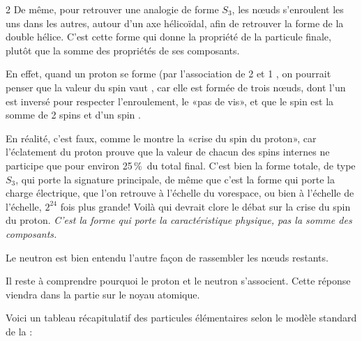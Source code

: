 \begin{multicols}{2}
De même, pour retrouver une analogie de forme $S_3$, les nœuds
s'enroulent les uns dans les autres, autour d'un axe hélicoïdal, afin
de retrouver la forme de la double hélice. C'est cette forme qui donne
la propriété de la particule finale, plutôt que la somme des
propriétés de ses composants.

En effet, quand un proton se forme (par l'association de 2 
et 1 , on pourrait penser que la valeur du spin vaut ,
car elle est formée de trois nœuds, dont l'un est inversé pour
respecter l'enroulement, le «pas de vis», et que le spin est la somme
de 2 spins  et d'un spin . 

En réalité, c'est faux, comme le
montre la «crise du spin du proton», car l'éclatement du proton
prouve que la valeur de chacun des spins internes ne participe
que pour environ 25\,\%\ du total final\cite{ashman1988measurement}. C'est bien la forme totale, de
type $S_3$, qui porte la signature principale, de même que c'est la
forme  qui porte la charge électrique, que l'on retrouve à
l'échelle du vorespace, ou bien à l'échelle de l'échelle, $2^{24}$ fois
plus grande! Voilà qui devrait clore le débat sur la crise du spin du
proton. \textit{C'est la forme qui porte la caractéristique physique, pas la
somme des composants.}

Le neutron est bien entendu l'autre façon de rassembler les nœuds
restants.

Il reste à comprendre pourquoi le proton et le neutron s'associent.
Cette réponse viendra dans la partie sur le noyau atomique.

Voici un tableau récapitulatif des particules élémentaires selon le
modèle standard de la \PQ:
\vfill

\end{multicols}
\vspace*{-1cm}
